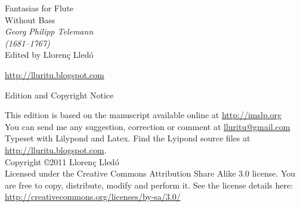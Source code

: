 \documentclass[a4paper]{article}
\begin{document}
{
\centering
\vspace*{0.08\textheight}
\fontsize{40}{50} Fantasias for Flute\\[0.5\baselineskip]
\Huge Without Bass\\[2\baselineskip]
{\huge \itshape Georg Philipp Telemann \\(1681–1767)\\[6\baselineskip]}
\Large Edited by Llorenç Lledó\par
\vspace{0.02\textheight}
\url{http://lluritu.blogspot.com}
\\[\baselineskip]
}

\newpage
\pagestyle{empty}

\begin{center}
\huge Edition and Copyright Notice
\end{center}
\vspace{0.09\textheight}
\large
This edition is based on the manuscript available online at \url{http://imslp.org} \\[0.3cm]
You can send me any suggestion, correction or comment at \href{mailto:lluritu@gmail.com}{lluritu@gmail.com} \\[1.3cm]

Typeset with Lilypond and Latex. Find the Lyipond source files at \url{http://lluritu.blogspot.com}.\\[1.3cm]

Copyright \copyright 2011 Llorenç Lledó\\[0.3cm]
Licensed under the Creative Commons Attribution Share Alike 3.0 license.
You are free to copy, distribute, modify and perform it.
See the license details here:\\
\url{http://creativecommons.org/licenses/by-sa/3.0/}\\[1.3cm]
\end{document}
